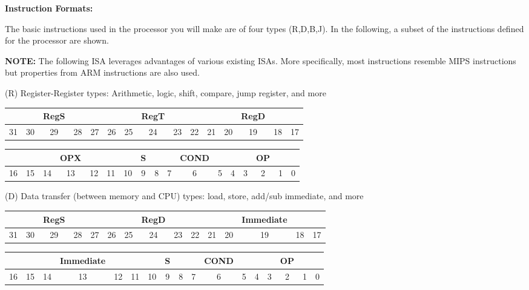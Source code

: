\documentclass[]{article}
\begin{document}
{\Large
	\textbf{
		Instruction Formats:
	}
}

\noindent The basic instructions used in the processor you will make are of four types (R,D,B,J).  In the following, a subset of the instructions defined for the processor are shown.
\newline

\noindent \textbf{NOTE:} The following ISA leverages advantages of various existing ISAs. More specifically, most instructions resemble MIPS instructions but properties from ARM instructions are also used.
\newline

\noindent (R) Register-Register types: Arithmetic, logic, shift, compare, jump register, and more

\begin{tabular}{|ccccc|ccccc|ccccc|}\hline
  &  & RegS &  &  &  &  & RegT &  &  &  &  & RegD &  &\\\hline
31&30&29&28&27&26&25&24&23&22&21&20&19&18&17\\\hline
\end{tabular}

\begin{tabular}{|ccccccc|c|cccc|ccccc|}\hline
	&  & & OPX & &  & & S & & & COND & & & & OP & & \\\hline
16&15&14&13&12&11&10&9&8&7&6&5&4&3&2&1&0\\\hline
\end{tabular}

\begin{figure}[ht!]
	\begin{center}
	\end{center}
\end{figure}


\noindent (D) Data transfer (between memory and CPU) types: load, store, add/sub immediate, and more

\begin{tabular}{|ccccc|ccccc|ccccc|}\hline
  &  & RegS &  &  &  &  & RegD &  &  &  &  & Immediate &  &\\\hline
31&30&29&28&27&26&25&24&23&22&21&20&19&18&17\\\hline
\end{tabular}

\begin{tabular}{|ccccccc|c|cccc|ccccc|}\hline
	&  & & Immediate & &  & & S & & & COND & & & & OP & & \\\hline
16&15&14&13&12&11&10&9&8&7&6&5&4&3&2&1&0\\\hline
\end{tabular}
\end{document}
